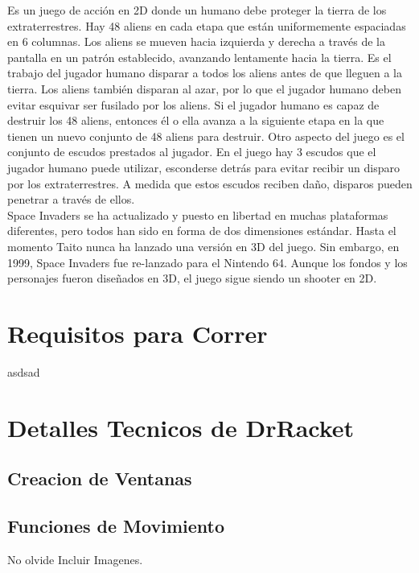 \documentclass[a4paper]{article}
\begin{document}
Es un juego de acción en 2D donde un humano debe proteger la tierra de los extraterrestres. Hay 48 aliens en cada etapa que están uniformemente espaciadas en 6 columnas. Los aliens se mueven hacia izquierda y derecha a través de la pantalla en un patrón establecido, avanzando lentamente hacia la tierra. Es el trabajo del jugador humano disparar a todos los aliens antes de que lleguen a la tierra. Los aliens también disparan al azar, por lo que el jugador humano deben evitar esquivar ser fusilado por los aliens. Si el jugador humano es capaz de destruir los 48 aliens, entonces él o ella avanza a la siguiente etapa en la que tienen un nuevo conjunto de 48 aliens para destruir. Otro aspecto del juego es el conjunto de escudos prestados al jugador. En el juego hay 3 escudos que el jugador humano puede utilizar,  esconderse detrás para evitar recibir un disparo por los extraterrestres. A medida que estos escudos reciben daño, disparos pueden penetrar a través de ellos.\\

Space Invaders se ha actualizado y puesto en libertad en muchas plataformas diferentes, pero todos han sido en forma de dos dimensiones estándar. Hasta el momento Taito nunca ha lanzado una versión en 3D del juego. Sin embargo, en 1999, Space Invaders fue re-lanzado para el Nintendo 64. Aunque los fondos y los personajes fueron diseñados en 3D, el juego sigue siendo un shooter en 2D.

\section{Requisitos para Correr}
asdsad
\section{Detalles Tecnicos de  DrRacket \label{Funciones}}
\subsection{Creacion de Ventanas}

\subsection{Funciones de Movimiento}
No olvide Incluir Imagenes.
\end{document}

